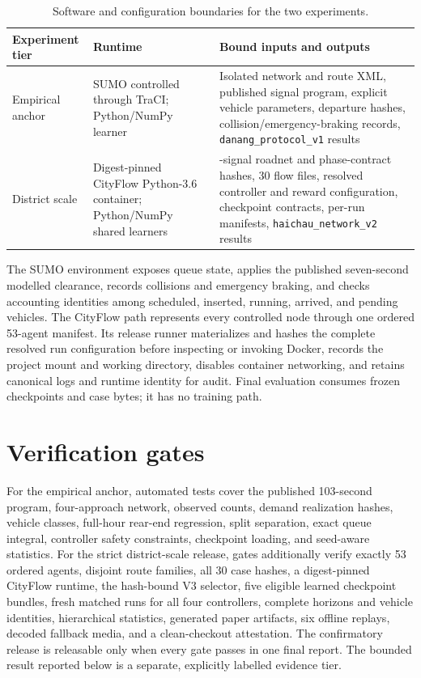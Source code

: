 \documentclass[12pt,a4paper]{report}
\begin{document}
\begin{table}[H]
\centering
\caption{Software and configuration boundaries for the two experiments.}\label{tab:software-stacks}
\small
\begin{tabularx}{\textwidth}{p{2.7cm}p{4.0cm}>{\raggedright\arraybackslash}X}
\toprule
Experiment tier & Runtime & Bound inputs and outputs \\
\midrule
Empirical anchor & SUMO controlled through TraCI; Python/NumPy learner & Isolated network and route XML, published signal program, explicit vehicle parameters, departure hashes, collision/emergency-braking records, \texttt{danang\_protocol\_v1} results \\
District scale & Digest-pinned CityFlow Python-3.6 container; Python/NumPy shared learners & 53-signal roadnet and phase-contract hashes, 30 flow files, resolved controller and reward configuration, checkpoint contracts, per-run manifests, \texttt{haichau\_network\_v2} results \\
\bottomrule
\end{tabularx}
\end{table}

The SUMO environment exposes queue state, applies the published seven-second modelled clearance, records collisions and emergency braking, and checks accounting identities among scheduled, inserted, running, arrived, and pending vehicles. The CityFlow path represents every controlled node through one ordered 53-agent manifest. Its release runner materializes and hashes the complete resolved run configuration before inspecting or invoking Docker, records the project mount and working directory, disables container networking, and retains canonical logs and runtime identity for audit. Final evaluation consumes frozen checkpoints and case bytes; it has no training path.

\section{Verification gates}
For the empirical anchor, automated tests cover the published 103-second program, four-approach network, observed counts, demand realization hashes, vehicle classes, full-hour rear-end regression, split separation, exact queue integral, controller safety constraints, checkpoint loading, and seed-aware statistics. For the strict district-scale release, gates additionally verify exactly 53 ordered agents, disjoint route families, all 30 case hashes, a digest-pinned CityFlow runtime, the hash-bound V3 selector, five eligible learned checkpoint bundles, fresh matched runs for all four controllers, complete horizons and vehicle identities, hierarchical statistics, generated paper artifacts, six offline replays, decoded fallback media, and a clean-checkout attestation. The confirmatory release is releasable only when every gate passes in one final report. The bounded result reported below is a separate, explicitly labelled evidence tier.
\end{document}
